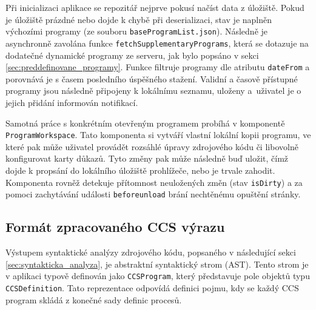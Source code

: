 Při inicializaci aplikace se repozitář nejprve pokusí načíst data z úložiště. 
Pokud je úložiště prázdné nebo dojde k chybě při deserializaci, stav je naplněn výchozími programy (ze souboru \texttt{baseProgramList.json}). 
Následně je asynchronně zavolána funkce \texttt{fetchSupplementaryPrograms}, která se dotazuje na dodatečné dynamické programy ze serveru, jak bylo popsáno v sekci \ref{sec:preddefinovane_programy}. 
Funkce filtruje programy dle atributu \texttt{dateFrom} a porovnává je s časem posledního úspěšného stažení. 
Validní a časově přístupné programy jsou následně připojeny k lokálnímu seznamu, uloženy a~uživatel je o jejich přidání informován notifikací.

Samotná práce s konkrétním otevřeným programem probíhá v komponentě \texttt{ProgramWorkspace}. 
Tato komponenta si vytváří vlastní lokální kopii programu, ve které pak může uživatel provádět rozsáhlé úpravy zdrojového kódu či libovolně konfigurovat karty důkazů.
Tyto změny pak může následně buď uložit, čímž dojde k propsání do lokálního úložiště prohlížeče, nebo je trvale zahodit. 
Komponenta rovněž detekuje přítomnost neuložených změn (stav \texttt{isDirty}) a za pomoci zachytávání události \texttt{beforeunload} brání nechtěnému opuštění stránky.

\subsection{Formát zpracovaného CCS výrazu}
\label{sec:struct_format}
Výstupem syntaktické analýzy zdrojového kódu, popsaného v následující sekci \ref{sec:syntakticka_analyza}, je abstraktní syntaktický strom (AST).
Tento strom je v aplikaci typově definován jako \texttt{CCSProgram}, který představuje pole objektů typu \texttt{CCSDefinition}. 
Tato reprezentace odpovídá definici pojmu, kdy se každý CCS program skládá z konečné sady definic procesů.

